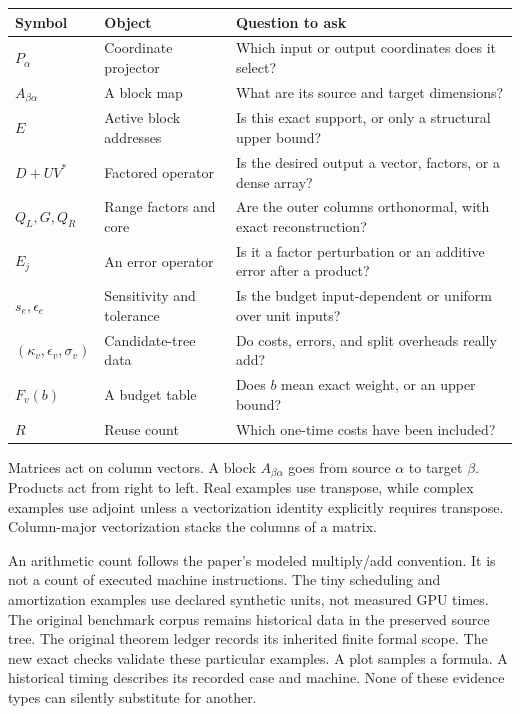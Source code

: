\begin{tabularx}{\linewidth}{@{}p{.18\linewidth}p{.27\linewidth}Y@{}}\toprule
Symbol & Object & Question to ask \\\midrule
$P_\alpha$ & Coordinate projector & Which input or output coordinates does it select?\\
$A_{\beta\alpha}$ & A block map & What are its source and target dimensions?\\
$E$ & Active block addresses & Is this exact support, or only a structural upper bound?\\
$D+UV^*$ & Factored operator & Is the desired output a vector, factors, or a dense array?\\
$Q_L,G,Q_R$ & Range factors and core & Are the outer columns orthonormal, with exact reconstruction?\\
$E_j$ & An error operator & Is it a factor perturbation or an additive error after a product?\\
$s_e,\epsilon_e$ & Sensitivity and tolerance & Is the budget input-dependent or uniform over unit inputs?\\
$(\kappa_v,\epsilon_v,\sigma_v)$ & Candidate-tree data & Do costs, errors, and split overheads really add?\\
$F_v(b)$ & A budget table & Does $b$ mean exact weight, or an upper bound?\\
$R$ & Reuse count & Which one-time costs have been included?\\\bottomrule
\end{tabularx}
Matrices act on column vectors. A block $A_{\beta\alpha}$ goes from source $\alpha$ to target $\beta$. Products act from right to left. Real examples use transpose, while complex examples use adjoint unless a vectorization identity explicitly requires transpose. Column-major vectorization stacks the columns of a matrix.

An arithmetic count follows the paper's modeled multiply/add convention. It is not a count of executed machine instructions. The tiny scheduling and amortization examples use declared synthetic units, not measured GPU times. The original benchmark corpus remains historical data in the preserved source tree.
The original theorem ledger records its inherited finite formal scope. The new exact checks validate these particular examples. A plot samples a formula. A historical timing describes its recorded case and machine. None of these evidence types can silently substitute for another.

